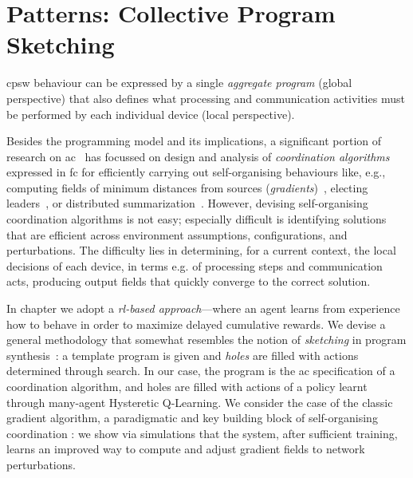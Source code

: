 


\sloppypar

\chapter[Patterns: Collective Program Sketching]{Patterns: Collective Program Sketching}\label{chap:learning:sketching}%
\minitoc%

\ac{cpsw} behaviour
 can be expressed by a single \emph{aggregate program} (global perspective)
 that also defines 
 what processing and communication activities
 must be performed by each individual device (local perspective).

Besides the programming model and its implications,
 a significant portion of research on \ac{ac}~\cite{DBLP:journals/jlap/ViroliBDACP19} has focussed
 on design and analysis of \emph{coordination algorithms} expressed in \ac{fc}
 for efficiently carrying out self-organising behaviours
 like, e.g., computing fields of minimum distances from sources (\emph{gradients})~\cite{DBLP:conf/ipsn/NagpalSB03,DBLP:journals/pervasive/MameiZL04,DBLP:conf/saso/AudritoCDV17},
 electing leaders~\cite{DBLP:conf/saso/MoBD18},
 or %
 distributed summarization~\cite{DBLP:journals/cee/AudritoCDPV21}.
%
However, devising self-organising coordination algorithms is not easy; especially difficult is identifying solutions
 that are efficient across environment assumptions, configurations, and perturbations.
%
The difficulty lies in determining, 
 for a current context,
 the local decisions of each device, 
 in terms e.g. of processing steps and communication acts,
 producing output fields that quickly converge to the correct solution.

In chapter we adopt a \emph{\ac{rl}-based approach}---where an agent learns from experience
 how to behave in order to maximize delayed cumulative rewards.
%
We devise a general methodology that somewhat resembles the notion of \emph{sketching} in program synthesis~\cite{solar2008program-synthesis-sketching}:
 a template program is given and \emph{holes} are filled with actions determined through search.
%
In our case, the program is the \ac{ac} specification of a coordination algorithm, and holes are filled with actions of a policy learnt through many-agent Hysteretic Q-Learning.
%
We consider the case of the classic gradient algorithm, 
 a paradigmatic and key building block of self-organising coordination \cite{DBLP:journals/jlap/ViroliBDACP19,beal2013organizing-aggregate,DBLP:journals/corr/abs-2201-03473}: we show via simulations 
 that the system, after sufficient training,
 learns an improved way to compute and adjust gradient fields to network perturbations.

